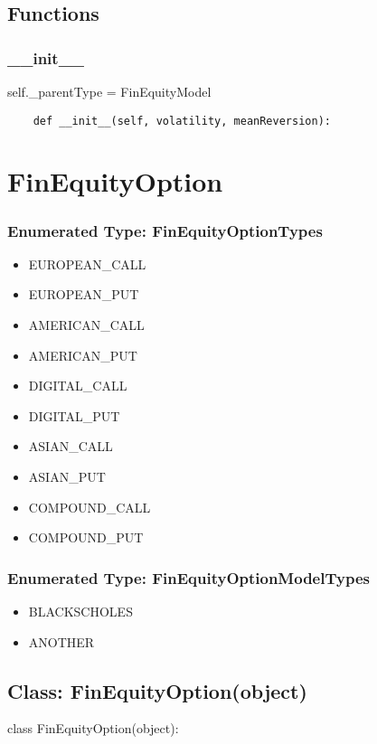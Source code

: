 \documentclass[twoside,11pt]{book}
\begin{document}
\subsection*{Functions}

\subsubsection*{{\bf \_\_init\_\_}}
self.\_parentType = FinEquityModel 

\begin{lstlisting}
    def __init__(self, volatility, meanReversion):
\end{lstlisting}

\newpage
\section{FinEquityOption}

\subsubsection{Enumerated Type: FinEquityOptionTypes}
\begin{itemize}
\item{EUROPEAN\_CALL}
\item{EUROPEAN\_PUT}
\item{AMERICAN\_CALL}
\item{AMERICAN\_PUT}
\item{DIGITAL\_CALL}
\item{DIGITAL\_PUT}
\item{ASIAN\_CALL}
\item{ASIAN\_PUT}
\item{COMPOUND\_CALL}
\item{COMPOUND\_PUT}
\end{itemize}

\subsubsection{Enumerated Type: FinEquityOptionModelTypes}
\begin{itemize}
\item{BLACKSCHOLES}
\item{ANOTHER}
\end{itemize}

\subsection*{Class: FinEquityOption(object)}
class FinEquityOption(object): 
\end{document}
